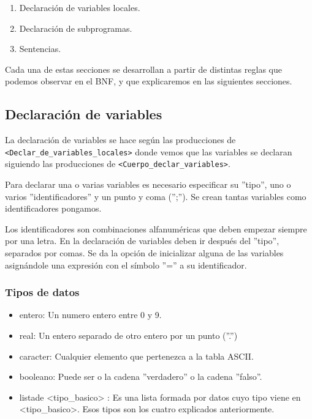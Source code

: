 \documentclass[12pt, spanish]{article}
\begin{document}
\begin{enumerate}
	\item Declaración de variables locales.
	\item Declaración de subprogramas.
	\item Sentencias.
\end{enumerate}

Cada una de estas secciones se desarrollan a partir de distintas reglas que podemos observar en el BNF, y que explicaremos en las siguientes secciones.

\subsection{Declaración de variables}

La declaración de variables se hace según las producciones de \texttt{<Declar_de_variables_locales>} donde vemos que las variables se declaran siguiendo las producciones de \texttt{<Cuerpo_declar_variables>}.


Para declarar una o varias variables es necesario especificar su ''tipo'', uno o varios ''identificadores'' y un punto y coma ('';''). Se crean tantas variables como identificadores pongamos.


Los identificadores son combinaciones alfanuméricas que deben empezar siempre por una letra. En la declaración de variables deben ir después del ''tipo'', separados por comas. Se da la opción de inicializar alguna de las variables asignándole una expresión con el símbolo ''='' a su identificador.

\subsubsection{Tipos de datos}

\begin{itemize}

	\item entero: Un numero entero entre 0 y 9.
	\item real: Un entero separado de otro entero por un punto (''.'')
	\item caracter: Cualquier elemento que pertenezca a la tabla ASCII.
	\item booleano: Puede ser o la cadena ''verdadero'' o la cadena ''falso''.
	\item listade <tipo_basico> : Es una lista formada por datos cuyo tipo viene en <tipo_basico>. Esos tipos son los cuatro explicados anteriormente.
\end{itemize}
\end{document}
